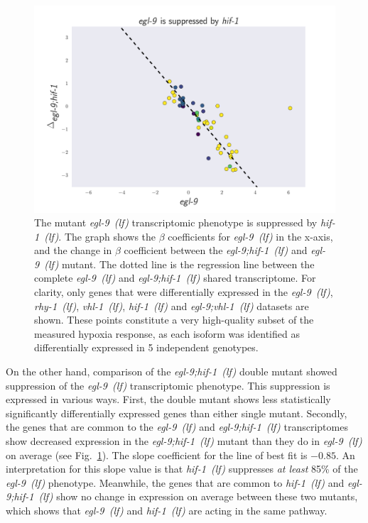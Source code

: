 \documentclass[9pt,twocolumn,twoside]{pnas-new}
\newcommand{\nog}{\emph{nog-1}}
\newcommand{\egl}{\emph{egl-9~(lf)}}
\newcommand{\rhy}{\emph{rhy-1~(lf)}}
\newcommand{\vhl}{\emph{vhl-1~(lf)}}
\newcommand{\eglvhl}{\emph{egl-9;vhl-1~(lf)}}
\newcommand{\eglhif}{\emph{egl-9;hif-1~(lf)}}
\newcommand{\hif}{\emph{hif-1~(lf)}}
\begin{document}
\begin{figure}[tbhp]
\centering
\includegraphics[width=\linewidth]{figs/egl9_epistatic_eglhif.pdf}
\caption{
The mutant \egl{} transcriptomic phenotype is suppressed by \hif{}.
The graph shows the $\beta$ coefficients for \egl{} in the x-axis, and the change
in $\beta$ coefficient between the \eglhif{} and \egl{} mutant. The dotted
line is the regression line between the complete \egl{} and \eglhif{} shared
transcriptome. For clarity, only genes that were differentially expressed in the
\egl{}, \rhy{}, \vhl{}, \hif{} and \eglvhl{} datasets are shown. These points
constitute a very high-quality subset of the measured hypoxia response, as each
isoform was identified as differentially expressed in 5 independent genotypes.
}
\label{fig:egl9epistasis}
\end{figure}

On the other hand, comparison of the \eglhif{} double mutant showed
suppression of the \egl{} transcriptomic phenotype. This suppression is expressed
in various ways. First, the double mutant shows less statistically significantly
differentially expressed genes than either single mutant. Secondly, the genes
that are common to the \egl{} and \eglhif{} transcriptomes show decreased
expression in the \eglhif{} mutant than they do in \egl{} on average (see
Fig.~\ref{fig:egl9epistasis}). The slope coefficient for the line of best fit is
$-0.85$. An interpretation for this slope value is that \hif{} suppresses
\emph{at least} 85\% of the \egl{} phenotype. Meanwhile, the genes that are common
to \hif{} and \eglhif{} show no change in expression on average between
these two mutants, which shows that \egl{} and \hif{} are acting in the same pathway.
\end{document}
